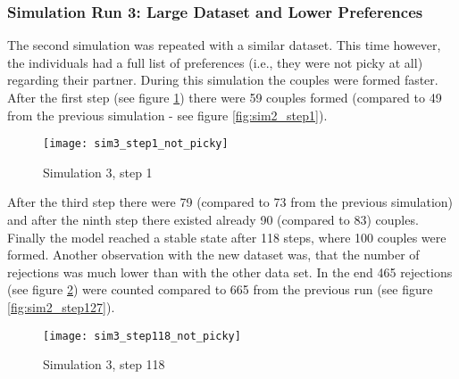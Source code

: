 \subsubsection{Simulation Run 3: Large Dataset and Lower Preferences}
The second simulation was repeated with a similar dataset. 
This time however, the individuals had a full list of preferences (i.e., they were not picky at all) regarding their partner.
During this simulation the couples were formed faster. After the first step (see figure \ref{fig:sim3_step1_not_picky}) there were 59 couples formed (compared to 49 from the previous simulation - see figure \ref{fig:sim2_step1}).
\begin{figure}[H]
  \centering
  \texttt{[image: sim3\_step1\_not\_picky]}
	\caption{Simulation 3, step 1}
	\label{fig:sim3_step1_not_picky}
\end{figure}

After the third step there were 79 (compared to 73 from the previous simulation) and after the ninth step there existed already 90 (compared to 83) couples.
Finally the model reached a stable state after 118 steps, where 100 couples were formed.
Another observation with the new dataset was, that the number of rejections was much lower than with the other data set. 
In the end 465 rejections (see figure \ref{fig:sim3_step118_not_picky}) were counted compared to 665 from the previous run (see figure \ref{fig:sim2_step127}).
\begin{figure}[H]
  \centering
  \texttt{[image: sim3\_step118\_not\_picky]}
	\caption{Simulation 3, step 118}
	\label{fig:sim3_step118_not_picky}
\end{figure}
